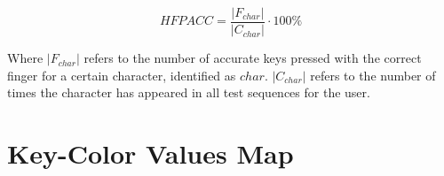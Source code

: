 \documentclass{report}
\begin{document}
\begin{equation}
	HFP ACC = \frac{|F_{char}|}{|C_{char}|} \cdot 100\%
\end{equation}

Where $|F_{char}|$ refers to the number of accurate keys pressed with the
correct finger for a certain character, identified as $char$. $|C_{char}|$
refers to the number of times the character has appeared in all test sequences
for the user.

\newpage
\appendix

\twocolumn
\chapter{Key-Color Values Map}
\label{appendix:key-map}

\centering
\end{document}
